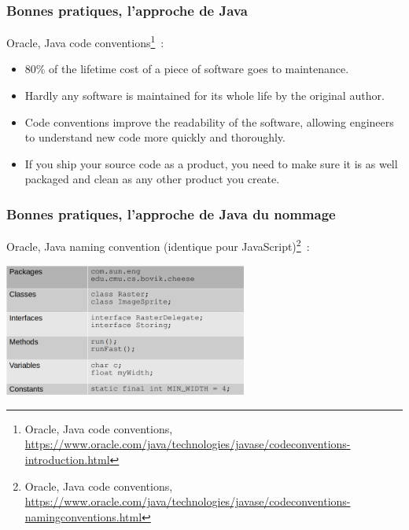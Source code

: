 \documentclass{beamer}
\begin{document}
    \begin{frame}
        \transdissolve
        \frametitle{Bonnes pratiques, l'approche de Java}
        Oracle, Java code conventions\footnote{Oracle, Java code conventions, \url{https://www.oracle.com/java/technologies/javase/codeconventions-introduction.html}}~:
        \bigbreak

        \begin{itemize}

            \item 80\% of the lifetime cost of a piece of software goes to maintenance.
            \item Hardly any software is maintained for its whole life by the original author.
            \item Code conventions improve the readability of the software, allowing engineers to understand new code more quickly and thoroughly.
            \item If you ship your source code as a product, you need to make sure it is as well packaged and clean as any other product you create.

        \end{itemize}

    \end{frame}

    \begin{frame}
        \transdissolve
        \frametitle{Bonnes pratiques, l'approche de Java du nommage}

        Oracle, Java naming convention (identique pour JavaScript)\footnote{Oracle, Java code conventions, \url{https://www.oracle.com/java/technologies/javase/codeconventions-namingconventions.html}}~:
        \bigbreak

        \centering
        \includegraphics[width=8cm]{image/Java-naming-convention.png}

    \end{frame}
\end{document}
